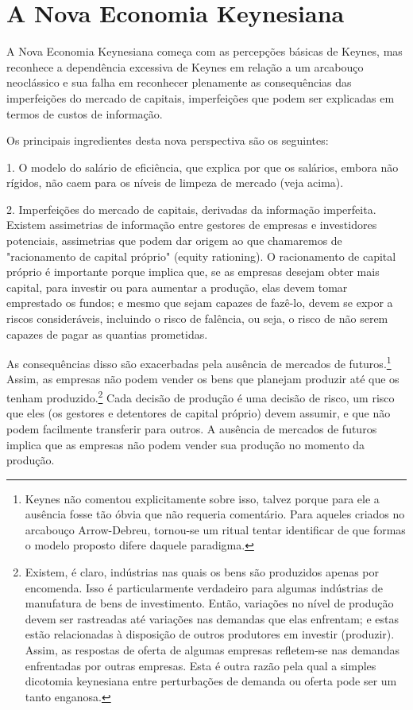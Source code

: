 \documentclass[12pt]{article}
\begin{document}
\section*{A Nova Economia Keynesiana}

A Nova Economia Keynesiana começa com as percepções básicas de Keynes, mas reconhece a dependência excessiva de Keynes em relação a um arcabouço neoclássico e sua falha em reconhecer plenamente as consequências das imperfeições do mercado de capitais, imperfeições que podem ser explicadas em termos de custos de informação.

Os principais ingredientes desta nova perspectiva são os seguintes:

1. O modelo do salário de eficiência, que explica por que os salários, embora não rígidos, não caem para os níveis de limpeza de mercado (veja acima).

2. Imperfeições do mercado de capitais, derivadas da informação imperfeita. Existem assimetrias de informação entre gestores de empresas e investidores potenciais, assimetrias que podem dar origem ao que chamaremos de "racionamento de capital próprio" (equity rationing). O racionamento de capital próprio é importante porque implica que, se as empresas desejam obter mais capital, para investir ou para aumentar a produção, elas devem tomar emprestado os fundos; e mesmo que sejam capazes de fazê-lo, devem se expor a riscos consideráveis, incluindo o risco de falência, ou seja, o risco de não serem capazes de pagar as quantias prometidas.

As consequências disso são exacerbadas pela ausência de mercados de futuros.\footnote{Keynes não comentou explicitamente sobre isso, talvez porque para ele a ausência fosse tão óbvia que não requeria comentário. Para aqueles criados no arcabouço Arrow-Debreu, tornou-se um ritual tentar identificar de que formas o modelo proposto difere daquele paradigma.} Assim, as empresas não podem vender os bens que planejam produzir até que os tenham produzido.\footnote{Existem, é claro, indústrias nas quais os bens são produzidos apenas por encomenda. Isso é particularmente verdadeiro para algumas indústrias de manufatura de bens de investimento. Então, variações no nível de produção devem ser rastreadas até variações nas demandas que elas enfrentam; e estas estão relacionadas à disposição de outros produtores em investir (produzir). Assim, as respostas de oferta de algumas empresas refletem-se nas demandas enfrentadas por outras empresas. Esta é outra razão pela qual a simples dicotomia keynesiana entre perturbações de demanda ou oferta pode ser um tanto enganosa.} Cada decisão de produção é uma decisão de risco, um risco que eles (os gestores e detentores de capital próprio) devem assumir, e que não podem facilmente transferir para outros. A ausência de mercados de futuros implica que as empresas não podem vender sua produção no momento da produção.
\end{document}
